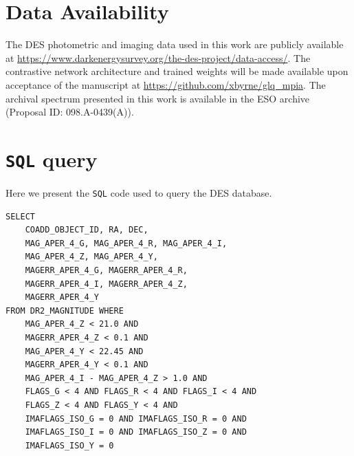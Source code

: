 \documentclass[fleqn,usenatbib]{mnras}
\begin{document}
\section*{Data Availability}

The DES photometric and imaging data used in this work are publicly available at \url{https://www.darkenergysurvey.org/the-des-project/data-access/}.
The contrastive network architecture and trained weights will be made available upon acceptance of the manuscript at \url{https://github.com/xbyrne/glq_mpia}.
The archival spectrum presented in this work is available in the ESO archive (Proposal ID: 098.A-0439(A)). 











\appendix

\section{\texttt{SQL} query} \label{app_sql}

Here we present the \texttt{SQL} code used to query the DES database.

\begin{verbatim}
SELECT 
    COADD_OBJECT_ID, RA, DEC,
    MAG_APER_4_G, MAG_APER_4_R, MAG_APER_4_I, 
    MAG_APER_4_Z, MAG_APER_4_Y,
    MAGERR_APER_4_G, MAGERR_APER_4_R,
    MAGERR_APER_4_I, MAGERR_APER_4_Z, 
    MAGERR_APER_4_Y
FROM DR2_MAGNITUDE WHERE
    MAG_APER_4_Z < 21.0 AND
    MAGERR_APER_4_Z < 0.1 AND
    MAG_APER_4_Y < 22.45 AND
    MAGERR_APER_4_Y < 0.1 AND
    MAG_APER_4_I - MAG_APER_4_Z > 1.0 AND
    FLAGS_G < 4 AND FLAGS_R < 4 AND FLAGS_I < 4 AND
    FLAGS_Z < 4 AND FLAGS_Y < 4 AND
    IMAFLAGS_ISO_G = 0 AND IMAFLAGS_ISO_R = 0 AND 
    IMAFLAGS_ISO_I = 0 AND IMAFLAGS_ISO_Z = 0 AND 
    IMAFLAGS_ISO_Y = 0
\end{verbatim}
\end{document}
